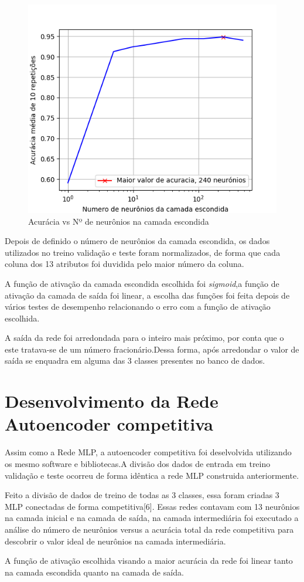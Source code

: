 \begin{figure}[H]
\centering %
\includegraphics[width=\columnwidth]{04-Figuras/acuracia}
\caption{Acurácia vs Nº de neurônios na camada escondida}
\label{figura:acuracia}
\end{figure}

Depois de definido o número de neurônios da camada escondida, os dados utilizados no treino validação e  teste foram normalizados, de forma que cada coluna dos 13 atributos foi duvidida pelo maior número da coluna.

A função de ativação da camada escondida escolhida foi \textit{sigmoid},a função de ativação da camada de saída foi linear, a escolha das funções foi feita depois de vários testes de desempenho relacionando o erro com a função de ativação escolhida.

A saída da rede foi arredondada para o inteiro mais próximo, por conta que o este tratava-se de um número fracionário.Dessa forma, após arredondar o valor de saída se enquadra em alguma das 3 classes presentes no banco de dados.

\section{Desenvolvimento da Rede Autoencoder competitiva}
Assim como a Rede MLP, a autoencoder competitiva foi deselvolvida utilizando os mesmo software e bibliotecas.A divisão dos dados de entrada em treino validação e teste ocorreu de forma idêntica a rede MLP construida anteriormente.

Feito a divisão de dados de treino de todas as 3 classes, essa foram criadas 3 MLP conectadas de forma competitiva[6]. Essas redes contavam com 13 neurônios na camada inicial e na camada de saída, na camada intermediária foi executado a análise do número de neurônios versus a acurácia total da rede competitiva para descobrir o valor ideal de neurônios na camada intermediária.



A função de ativação escolhida visando a maior acurácia da rede foi linear tanto na camada escondida quanto na camada de saída.